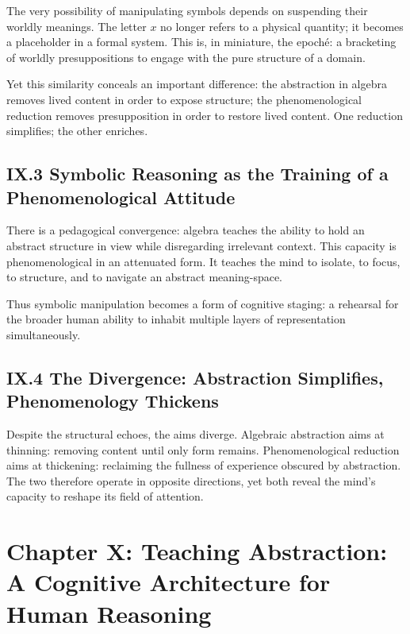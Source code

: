 \documentclass[11pt,letterpaper]{article}
\begin{document}
The very possibility of manipulating symbols depends on suspending their worldly meanings. The letter \(x\) no longer refers to a physical quantity; it becomes a placeholder in a formal system. This is, in miniature, the epoché: a bracketing of worldly presuppositions to engage with the pure structure of a domain.

Yet this similarity conceals an important difference: the abstraction in algebra removes lived content in order to expose structure; the phenomenological reduction removes presupposition in order to restore lived content. One reduction simplifies; the other enriches.

\subsection{IX.3 Symbolic Reasoning as the Training of a Phenomenological Attitude}

There is a pedagogical convergence: algebra teaches the ability to hold an abstract structure in view while disregarding irrelevant context. This capacity is phenomenological in an attenuated form. It teaches the mind to isolate, to focus, to structure, and to navigate an abstract meaning-space.

Thus symbolic manipulation becomes a form of cognitive staging: a rehearsal for the broader human ability to inhabit multiple layers of representation simultaneously.

\subsection{IX.4 The Divergence: Abstraction Simplifies, Phenomenology Thickens}

Despite the structural echoes, the aims diverge. Algebraic abstraction aims at thinning: removing content until only form remains. Phenomenological reduction aims at thickening: reclaiming the fullness of experience obscured by abstraction. The two therefore operate in opposite directions, yet both reveal the mind’s capacity to reshape its field of attention.

\newpage

\section{Chapter X: Teaching Abstraction: A Cognitive Architecture for Human Reasoning}
\end{document}
